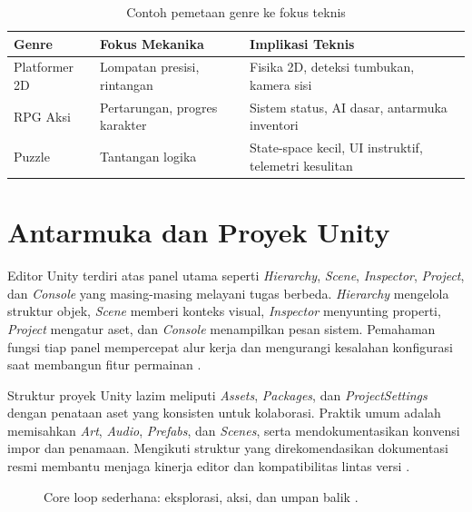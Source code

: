 \documentclass[../main.tex]{subfiles}
\begin{document}
\begin{table}[h]
  \centering
  \caption{Contoh pemetaan genre ke fokus teknis}
  \begin{tabularx}{\textwidth}{@{}lXX@{}}
    \toprule
    Genre & Fokus Mekanika & Implikasi Teknis \\
    \midrule
    Platformer 2D & Lompatan presisi, rintangan & Fisika 2D, deteksi tumbukan, kamera sisi \\
    RPG Aksi & Pertarungan, progres karakter & Sistem status, AI dasar, antarmuka inventori \\
    Puzzle & Tantangan logika & State-space kecil, UI instruktif, telemetri kesulitan \\
    \bottomrule
  \end{tabularx}
\end{table}

\section{Antarmuka dan Proyek Unity}
Editor Unity terdiri atas panel utama seperti \textit{Hierarchy}, \textit{Scene}, \textit{Inspector}, \textit{Project}, dan \textit{Console} yang masing-masing melayani tugas berbeda. \textit{Hierarchy} mengelola struktur objek, \textit{Scene} memberi konteks visual, \textit{Inspector} menyunting properti, \textit{Project} mengatur aset, dan \textit{Console} menampilkan pesan sistem. Pemahaman fungsi tiap panel mempercepat alur kerja dan mengurangi kesalahan konfigurasi saat membangun fitur permainan \parencite{unity-manual-overview}.

Struktur proyek Unity lazim meliputi \textit{Assets}, \textit{Packages}, dan \textit{ProjectSettings} dengan penataan aset yang konsisten untuk kolaborasi. Praktik umum adalah memisahkan \textit{Art}, \textit{Audio}, \textit{Prefabs}, dan \textit{Scenes}, serta mendokumentasikan konvensi impor dan penamaan. Mengikuti struktur yang direkomendasikan dokumentasi resmi membantu menjaga kinerja editor dan kompatibilitas lintas versi \parencite{unity-project-structure}.

\begin{figure}[h]
  \centering
  \caption{Core loop sederhana: eksplorasi, aksi, dan umpan balik \parencite{gpp-nystrom}.}
\end{figure}

\onlyinsubfile{\printbibliography}
\end{document}
